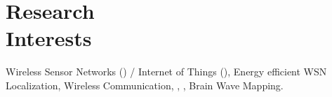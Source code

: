 \vspace{-2.5em}
{\section{Research\\Interests}
Wireless Sensor Networks () / Internet of Things (), Energy efficient WSN Localization, Wireless Communication, , , Brain Wave Mapping.\\
\vspace{-1em}
\sectionline
}

